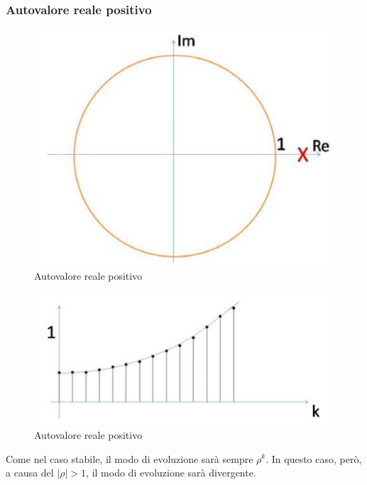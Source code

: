 \documentclass[a4paper]{report}
\begin{document}
\subsubsection{Autovalore reale positivo}
\begin{figure}[!h]
  \begin{center}
    \includegraphics[scale=0.4]{./figures/autovaloreRealePositivoInstabile00.png}
    \caption{Autovalore reale positivo}\label{fig:autovaloreRealePositivoInstabile00}
  \end{center}
\end{figure}
\begin{figure}[!h]
  \begin{center}
    \includegraphics[scale=0.4]{./figures/autovaloreRealePositivoInstabile01.png}
    \caption{Autovalore reale positivo}\label{fig:autovaloreRealePositivoInstabile01}
  \end{center}
\end{figure}
Come nel caso stabile, il modo di evoluzione sar\`a sempre
$\rho^k$. In questo caso, per\`o, a causa del $|\rho| > 1$, il modo di
evoluzione sar\`a divergente.
\end{document}
